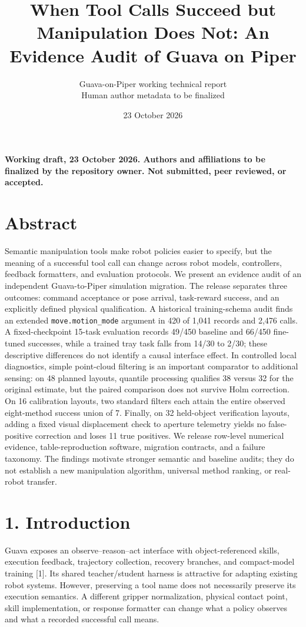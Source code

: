 \documentclass[10pt]{article}
\title{When Tool Calls Succeed but Manipulation Does Not: An Evidence Audit of Guava on Piper}
\author{Guava-on-Piper working technical report\\Human author metadata to be finalized}
\date{23 October 2026}
\begin{document}
\maketitle

\textbf{Working draft, 23 October 2026. Authors and affiliations to be finalized by the repository owner. Not submitted, peer reviewed, or accepted.}

\section*{Abstract}

Semantic manipulation tools make robot policies easier to specify, but the meaning of a successful tool call can change across robot models, controllers, feedback formatters, and evaluation protocols. We present an evidence audit of an independent Guava-to-Piper simulation migration. The release separates three outcomes: command acceptance or pose arrival, task-reward success, and an explicitly defined physical qualification. A historical training-schema audit finds an extended \texttt{move.motion\_mode} argument in 420 of 1,041 records and 2,476 calls. A fixed-checkpoint 15-task evaluation records 49/450 baseline and 66/450 fine-tuned successes, while a trained tray task falls from 14/30 to 2/30; these descriptive differences do not identify a causal interface effect. In controlled local diagnostics, simple point-cloud filtering is an important comparator to additional sensing: on 48 planned layouts, quantile processing qualifies 38 versus 32 for the original estimate, but the paired comparison does not survive Holm correction. On 16 calibration layouts, two standard filters each attain the entire observed eight-method success union of 7. Finally, on 32 held-object verification layouts, adding a fixed visual displacement check to aperture telemetry yields no false-positive correction and loses 11 true positives. We release row-level numerical evidence, table-reproduction software, migration contracts, and a failure taxonomy. The findings motivate stronger semantic and baseline audits; they do not establish a new manipulation algorithm, universal method ranking, or real-robot transfer.

\section*{1. Introduction}

Guava exposes an observe--reason--act interface with object-referenced skills, execution feedback, trajectory collection, recovery branches, and compact-model training [1]. Its shared teacher/student harness is attractive for adapting existing robot systems. However, preserving a tool name does not necessarily preserve its execution semantics. A different gripper normalization, physical contact point, skill implementation, or response formatter can change what a policy observes and what a recorded successful call means.
\end{document}
